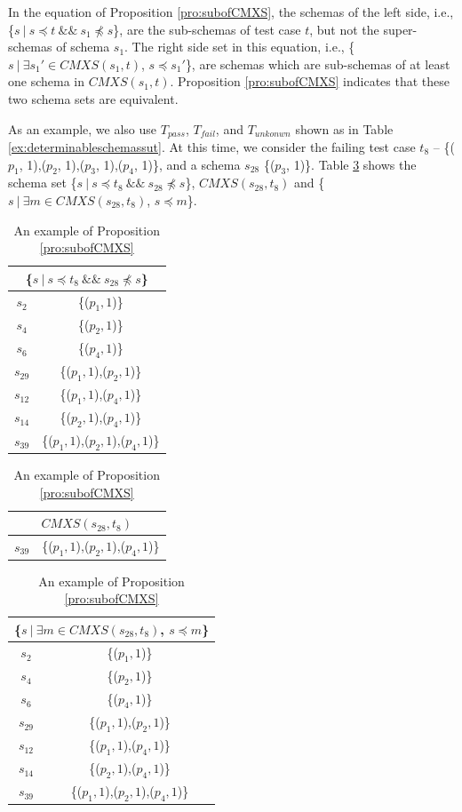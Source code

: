 In the equation of Proposition \ref{pro:subofCMXS}, the schemas of the left side, i.e., \{$s\ |\ s \preceq t\ \&\&\ s_{1} \npreceq s$\}, are the sub-schemas of test case $t$, but not the super-schemas of  schema $s_{1}$.  The right side set in this equation, i.e., \{$ s\ |\ \exists s_{1}' \in CMXS(s_{1}, t)$, $s \preceq s_{1}'$\}, are schemas which are sub-schemas of at least one schema in $CMXS(s_{1}, t)$. Proposition \ref{pro:subofCMXS} indicates that these two schema sets are equivalent.

As an example, we also use $T_{pass}$, $T_{fail}$, and $T_{unkonwn}$ shown as in Table \ref{ex:determinableschemassut}. At this time, we consider the failing test case $t_{8}$ -- \{($p_{1}$, 1),($p_{2}$, 1),($p_{3}$, 1),($p_{4}$, 1)\}, and a schema $s_{28}$  \{($p_{3}$, 1)\}.
Table \ref{examleOfCMXSPro} shows the schema set  \{$s\ |\ s \preceq t_{8}\ \&\&\ s_{28} \npreceq s$\}, $CMXS(s_{28}, t_{8})$ and \{$ s\ |\ \exists m \in CMXS(s_{28}, t_{8})$, $s \preceq m$\}.

 \begin{table}[htbp]
  \centering
  \caption{An example of Proposition \ref{pro:subofCMXS}}
  \label{examleOfCMXSPro}
    \begin{tabular}{|c|c|} \hline
     \multicolumn{2}{|c|}{\{$s\ |\ s \preceq t_{8}\ \&\&\ s_{28} \npreceq s$\}} \\ \hline
   $s_{2}$ & \{($p_{1}, 1$)\} \\
   $s_{4}$ & \{($p_{2}, 1$)\} \\
   $s_{6}$ & \{($p_{4}, 1$)\} \\
   $s_{29}$ & \{($p_{1}, 1$),($p_{2}, 1$)\} \\
   $s_{12}$ & \{($p_{1}, 1$),($p_{4}, 1$)\} \\
   $s_{14}$ & \{($p_{2}, 1$),($p_{4}, 1$)\} \\
   $s_{39}$ & \{($p_{1}, 1$),($p_{2}, 1$),($p_{4}, 1$)\} \\  \hline
    \end{tabular}%
\quad
    \begin{tabular}{|c|c|} \hline
     \multicolumn{2}{|c|}{$CMXS(s_{28}, t_{8})$} \\ \hline
   $s_{39}$ & \{($p_{1}, 1$),($p_{2}, 1$),($p_{4}, 1$)\} \\ \hline
    \end{tabular}%
\quad
    \begin{tabular}{|c|c|} \hline
   \multicolumn{2}{|c|}{\{$ s\ |\ \exists m \in CMXS(s_{28}, t_{8})$, $s \preceq m$\}}\\ \hline
   $s_{2}$ & \{($p_{1}, 1$)\} \\
   $s_{4}$ & \{($p_{2}, 1$)\} \\
   $s_{6}$ & \{($p_{4}, 1$)\} \\
   $s_{29}$ & \{($p_{1}, 1$),($p_{2}, 1$)\} \\
   $s_{12}$ & \{($p_{1}, 1$),($p_{4}, 1$)\} \\
   $s_{14}$ & \{($p_{2}, 1$),($p_{4}, 1$)\} \\
   $s_{39}$ & \{($p_{1}, 1$),($p_{2}, 1$),($p_{4}, 1$)\} \\  \hline
    \end{tabular}%
\end{table}


